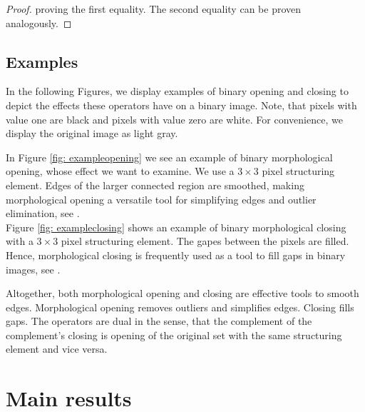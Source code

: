\documentclass[a4paper,12pt]{article}
\theoremstyle{plain}
\theoremstyle{definition}
\numberwithin{equation}{section}
\begin{document}
\begin{proof}
	proving the first equality. The second equality can be proven analogously.
\end{proof}

\newpage



\subsection{Examples}\label{section: morphologyexamples}

In the following Figures, we display examples of binary opening and closing to depict the effects these operators have on a binary image. Note, that pixels with value one are black and pixels with value zero are white. For convenience, we display the original image as light gray.

In Figure \ref{fig: exampleopening} we see an example of binary morphological opening, whose effect we want to examine. We use a $3 \times 3$ pixel structuring element. Edges of the larger connected region are smoothed, making morphological opening a versatile tool for simplifying edges and outlier elimination, see \cite[p.~69]{imageprocessing}.\\



Figure \ref{fig: exampleclosing} shows an example of binary morphological closing with a $3 \times 3$ pixel structuring element. The gapes between the pixels are filled. Hence, morphological closing is frequently used as a tool to fill gaps in binary images, see \cite[p.~69]{imageprocessing}.

Altogether, both morphological opening and closing are effective tools to smooth edges. Morphological opening removes outliers and simplifies edges. Closing fills gaps. The operators are dual in the sense, that the complement of the complement's closing is opening of the original set with the same structuring element and vice versa.



\newpage



\section{Main results}\label{section: mainresults}
\end{document}
